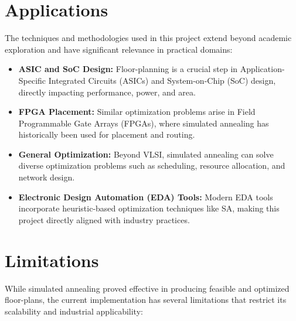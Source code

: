 \documentclass[9pt,a4paper,twoside]{rho-class/rho}
\begin{document}
\section{Applications}
The techniques and methodologies used in this project extend beyond academic exploration and have significant relevance in practical domains:
\begin{itemize}
    \item \textbf{ASIC and SoC Design:} Floor-planning is a crucial step in Application-Specific Integrated Circuits (ASICs) and System-on-Chip (SoC) design, directly impacting performance, power, and area.
    \item \textbf{FPGA Placement:} Similar optimization problems arise in Field Programmable Gate Arrays (FPGAs), where simulated annealing has historically been used for placement and routing.
    \item \textbf{General Optimization:} Beyond VLSI, simulated annealing can solve diverse optimization problems such as scheduling, resource allocation, and network design.
    \item \textbf{Electronic Design Automation (EDA) Tools:} Modern EDA tools incorporate heuristic-based optimization techniques like SA, making this project directly aligned with industry practices.
\end{itemize}

\section{Limitations}
While simulated annealing proved effective in producing feasible and optimized floor-plans, the current implementation has several limitations that restrict its scalability and industrial applicability:
\end{document}
